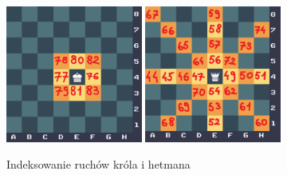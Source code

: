 \begin{figure}[h]
\centering
\includegraphics[width=0.4\textwidth]{images/king_moves.png}
\hspace{1cm}
\includegraphics[width=0.4\textwidth]{images/queen_moves.png}
\caption{Indeksowanie ruchów króla i hetmana}
\end{figure}
